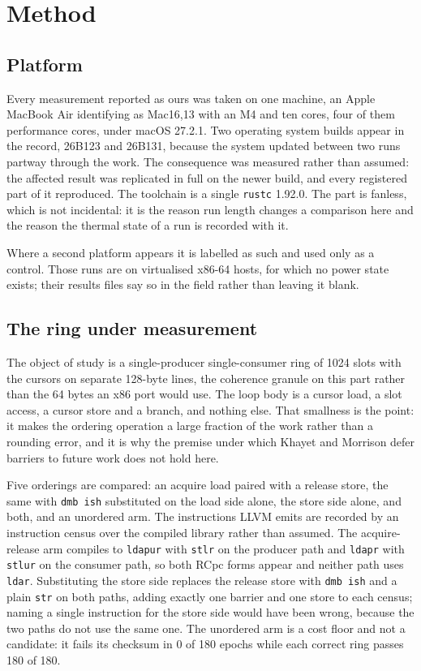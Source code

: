 \documentclass[conference]{IEEEtran}
\begin{document}
\section{Method}
\label{sec:method}

\subsection{Platform}

Every measurement reported as ours was taken on one machine, an Apple MacBook
Air identifying as Mac16,13 with an M4 and ten cores, four of them performance
cores, under macOS 27.2.1. Two operating system builds appear in the record,
26B123 and 26B131, because the system updated between two runs partway through
the work. The consequence was measured rather than assumed: the affected result
was replicated in full on the newer build, and every registered part of it
reproduced. The toolchain is a single \texttt{rustc} 1.92.0. The part is
fanless, which is not incidental: it is the reason run length changes a
comparison here and the reason the thermal state of a run is recorded with it.

Where a second platform appears it is labelled as such and used only as a
control. Those runs are on virtualised x86-64 hosts, for which no power state
exists; their results files say so in the field rather than leaving it blank.

\subsection{The ring under measurement}

The object of study is a single-producer single-consumer ring of 1024 slots
with the cursors on separate 128-byte lines, the coherence granule on this part
rather than the 64 bytes an x86 port would use. The loop body is a cursor load,
a slot access, a cursor store and a branch, and nothing else. That smallness is
the point: it makes the ordering operation a large fraction of the work rather
than a rounding error, and it is why the premise under which Khayet and
Morrison defer barriers to future work does not hold here.

Five orderings are compared: an acquire load paired with a release store, the
same with \texttt{dmb ish} substituted on the load side alone, the store side
alone, and both, and an unordered arm. The instructions LLVM emits are recorded
by an instruction census over the compiled library rather than assumed. The
acquire-release arm compiles to \texttt{ldapur} with \texttt{stlr} on the
producer path and \texttt{ldapr} with \texttt{stlur} on the consumer path, so
both RCpc forms appear and neither path uses \texttt{ldar}. Substituting the
store side replaces the release store with \texttt{dmb ish} and a plain
\texttt{str} on both paths, adding exactly one barrier and one store to each
census; naming a single instruction for the store side would have been wrong,
because the two paths do not use the same one. The unordered arm is a cost
floor and not a candidate: it fails its checksum in 0 of 180 epochs while each
correct ring passes 180 of 180.
\end{document}

